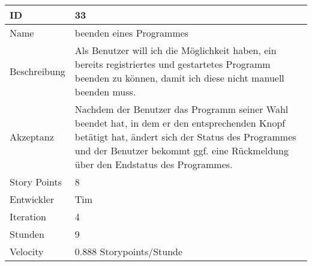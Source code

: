 \begin{table}[htbp]
\begin{minipage}{\linewidth}
\setlength{\tymax}{0.5\linewidth}
\centering
\small
\begin{tabulary}{\textwidth}{|l|p{10cm}|} \hline
 ID   &33\\\hline


Name  &beenden eines Programmes\\\hline
Beschreibung&Als Benutzer will ich die Möglichkeit haben, ein bereits registriertes und gestartetes Programm beenden zu können, damit ich diese nicht manuell beenden muss.\\\hline
Akzeptanz &Nachdem der Benutzer das Programm seiner Wahl beendet hat, in dem er den entsprechenden Knopf betätigt hat, ändert sich der Status des Programmes und der Benutzer bekommt ggf. eine Rückmeldung über den Endstatus des Programmes.\\\hline
Story Points&8\\\hline
Entwickler &Tim\\\hline
Iteration &4\\\hline
Stunden  &9\\\hline
Velocity &0.888 Storypoints\slash Stunde\\\hline
\end{tabulary}
\end{minipage}
\end{table}



